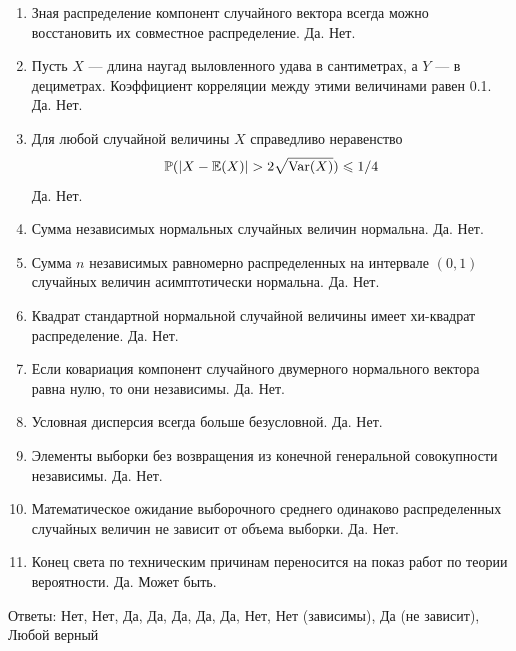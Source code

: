 \documentclass[12pt, a4paper]{article}\usepackage[]{graphicx}\usepackage[]{color}
\begin{document}
\begin{enumerate}
\item Зная распределение компонент случайного вектора всегда можно восстановить их совместное распределение. Да. Нет.
\item Пусть $X$ — длина наугад выловленного удава в сантиметрах, а $Y$ — в дециметрах. Коэффициент корреляции между этими величинами равен 0.1. Да. Нет.
\item Для любой случайной величины $X$ справедливо неравенство
\[ \P(|X-\E(X)|>2\sqrt{\Var(X)})\leq 1/4 \]
Да. Нет.
\item Сумма независимых нормальных случайных величин нормальна. Да. Нет.
\item  Сумма $n$ независимых равномерно распределенных на интервале $(0,1)$ случайных величин асимптотически нормальна. Да. Нет.
\item Квадрат стандартной нормальной случайной величины имеет хи-квадрат распределение. Да. Нет.
\item Если ковариация компонент случайного двумерного нормального вектора равна нулю, то они независимы. Да. Нет.
\item Условная дисперсия всегда больше безусловной. Да. Нет.
\item Элементы выборки без возвращения из конечной генеральной совокупности независимы. Да. Нет.
\item Математическое ожидание выборочного среднего одинаково распределенных случайных величин не зависит от объема выборки. Да. Нет.
\item Конец света по техническим причинам переносится на показ работ по теории вероятности. Да. Может быть.
\end{enumerate}

Ответы: Нет, Нет, Да, Да, Да, Да, Да, Нет, Нет (зависимы), Да (не зависит), Любой верный
\end{document}

